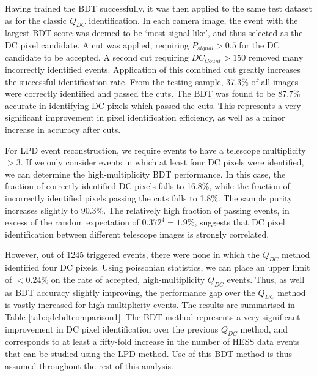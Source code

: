 \documentclass{article}
\begin{document}
Having trained the BDT successfully, it was then applied to the same test dataset as for the classic $Q_{DC}$ identification. In each camera image, the event with the largest BDT score was deemed to be \textquoteleft most signal-like', and thus selected as the DC pixel candidate. A cut was applied, requiring $P_{signal} > 0.5$ for the DC candidate to be accepted. A second cut requiring $DC_{Count} > 150$ removed many incorrectly identified events. Application of this combined cut greatly increases the successful identification rate. From the testing sample, 37.3\% of all images were correctly identified and passed the cuts. The BDT was found to be 87.7\% accurate in identifying DC pixels which passed the cuts. This represents a very significant improvement in pixel identification efficiency, as well as a minor increase in accuracy after cuts. 

For LPD event reconstruction, we require events to have a telescope multiplicity $>3$. If we only consider events in which at least four DC pixels were identified, we can determine the high-multiplicity BDT performance. In this case, the fraction of correctly identified DC pixels falls to 16.8\%, while the fraction of incorrectly identified pixels passing the cuts falls to 1.8\%. The sample purity increases slightly to 90.3\%. The relatively high fraction of passing events, in excess of the random expectation of $0.372^{4}=1.9 \%$, suggests that DC pixel identification between different telescope images is strongly correlated. 

However, out of 1245 triggered events, there were none in which the $Q_{DC}$ method identified four DC pixels. Using poissonian statistics, we can place an upper limit of $<0.24 \%$ on the rate of accepted, high-multiplicity $Q_{DC}$ events. Thus, as well as BDT accuracy slightly improving, the performance gap over the $Q_{DC}$ method is vastly increased for high-multiplicity events. The results are summarised in Table \ref{tab:qdcbdtcomparison1}. The BDT method represents a very significant improvement in DC pixel identification over the previous $Q_{DC}$ method, and corresponds to at least a fifty-fold increase in the number of HESS data events that can be studied using the LPD method. Use of this BDT method is thus assumed throughout the rest of this analysis.
\end{document}
